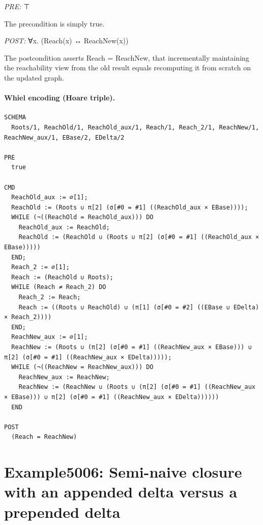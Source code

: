 \documentclass[10pt]{article}
\begin{document}
\textit{PRE:} ⊤\par The precondition is simply true.

\textit{POST:} ∀x. (Reach(x) ↔ ReachNew(x))\par The postcondition asserts Reach = ReachNew, that incrementally maintaining the reachability view from the old result equals recomputing it from scratch on the updated graph.

\paragraph{Whiel encoding (Hoare triple).}

\begin{Verbatim}[fontsize=\scriptsize,breaklines=true,breakanywhere=true,frame=single,framesep=1.5mm]
SCHEMA
  Roots/1, ReachOld/1, ReachOld_aux/1, Reach/1, Reach_2/1, ReachNew/1, ReachNew_aux/1, EBase/2, EDelta/2

PRE
  true 

CMD
  ReachOld_aux := ∅[1];
  ReachOld := (Roots ∪ π[2] (σ[#0 = #1] ((ReachOld_aux × EBase))));
  WHILE (¬((ReachOld = ReachOld_aux))) DO
    ReachOld_aux := ReachOld;
    ReachOld := (ReachOld ∪ (Roots ∪ π[2] (σ[#0 = #1] ((ReachOld_aux × EBase)))))
  END;
  Reach_2 := ∅[1];
  Reach := (ReachOld ∪ Roots);
  WHILE (Reach ≠ Reach_2) DO
    Reach_2 := Reach;
    Reach := ((Roots ∪ ReachOld) ∪ (π[1] (σ[#0 = #2] ((EBase ∪ EDelta) × Reach_2))))
  END;
  ReachNew_aux := ∅[1];
  ReachNew := (Roots ∪ (π[2] (σ[#0 = #1] ((ReachNew_aux × EBase))) ∪ π[2] (σ[#0 = #1] ((ReachNew_aux × EDelta)))));
  WHILE (¬((ReachNew = ReachNew_aux))) DO
    ReachNew_aux := ReachNew;
    ReachNew := (ReachNew ∪ (Roots ∪ (π[2] (σ[#0 = #1] ((ReachNew_aux × EBase))) ∪ π[2] (σ[#0 = #1] ((ReachNew_aux × EDelta))))))
  END

POST
  (Reach = ReachNew)
\end{Verbatim}

\Needspace{0.45\textheight}

\section{Example5006: Semi-naive closure with an appended delta versus a prepended delta}\label{case:Example5006}
\end{document}
